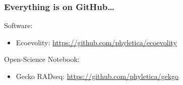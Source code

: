 \begin{frame}
    \frametitle{Everything is on GitHub\ldots}
    Software:\\
    \begin{itemize}
        \item Ecoevolity:
            \url{https://github.com/phyletica/ecoevolity}
    \end{itemize}

    \medskip
    Open-Science Notebook:\\
    \begin{itemize}
        \item Gecko RADseq:
            \url{https://github.com/phyletica/gekgo}
    \end{itemize}
\end{frame}
